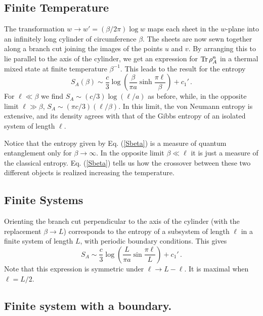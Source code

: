 \documentclass{ws-ijqi}
\begin{document}
\subsection{Finite Temperature}

The transformation $w\to w'=(\beta/2\pi)\log w$ maps each sheet in
the $w$-plane into an infinitely long cylinder of circumference $\beta$. 
The sheets are now sewn together along a branch cut joining the images
of the points $u$ and $v$. By arranging this to lie parallel to the axis
of the cylinder, we get an expression for ${\rm Tr}\,\rho_{A}^n$
in a thermal mixed state at finite temperature $\beta^{-1}$. 
This leads to the result for the entropy
\begin{equation}
S_A(\beta)\sim
\frac{c}{3}\log\left(\frac{\beta}{\pi a}\sinh\frac{\pi\ell}{\beta}\right)+c_1'\,.
\label{Sbeta}
\end{equation}
For $\ell\ll\beta$ we find $S_A\sim(c/3)\log(\ell/a)$ as before, while, in the
opposite limit $\ell\gg\beta$, $S_A\sim(\pi c/3)(\ell/\beta)$. In this
limit, the von Neumann entropy is extensive, and its density agrees with
that of the Gibbs entropy of an isolated system of length $\ell$.

Notice that the entropy given by Eq. (\ref{Sbeta}) is a measure of quantum
entanglement only for $\beta\to\infty$. In the opposite limit $\beta\ll\ell$
it is just a measure of the classical entropy. Eq. (\ref{Sbeta})
tells us how the crossover between these two different objects is realized
increasing the temperature.

\subsection{Finite Systems}

Orienting the branch cut perpendicular to the axis
of the cylinder (with the replacement $\beta\to L$) corresponds
to the entropy of a subsystem of length $\ell$ in a finite system of
length $L$, with periodic boundary conditions. 
This gives 
\begin{equation}
S_A\sim \frac{c}{3}\log\left(\frac{L}{\pi a}\sin\frac{\pi\ell}{L}\right)+c_1'\,.
\end{equation}
Note that this expression is symmetric under $\ell\to L-\ell$. It is
maximal when $\ell=L/2$. 

\subsection{Finite system with a boundary.}
\end{document}
